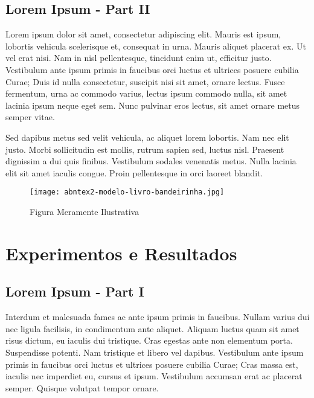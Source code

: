 \documentclass[
	12pt,				%
    oneside,			%
	a4paper,			%
	english,			%
	french,				%
	spanish,			%
	brazil				%
	]{abntex2}
\begin{document}
\section{Lorem Ipsum - Part II}

Lorem ipsum dolor sit amet, consectetur adipiscing elit. Mauris est ipsum, lobortis vehicula scelerisque et, consequat in urna. Mauris aliquet placerat ex. Ut vel erat nisi. Nam in nisl pellentesque, tincidunt enim ut, efficitur justo. Vestibulum ante ipsum primis in faucibus orci luctus et ultrices posuere cubilia Curae; Duis id nulla consectetur, suscipit nisi sit amet, ornare lectus. Fusce fermentum, urna ac commodo varius, lectus ipsum commodo nulla, sit amet lacinia ipsum neque eget sem. Nunc pulvinar eros lectus, sit amet ornare metus semper vitae.

Sed dapibus metus sed velit vehicula, ac aliquet lorem lobortis. Nam nec elit justo. Morbi sollicitudin est mollis, rutrum sapien sed, luctus nisl. Praesent dignissim a dui quis finibus. Vestibulum sodales venenatis metus. Nulla lacinia elit sit amet iaculis congue. Proin pellentesque in orci laoreet blandit.

\begin{figure}[!ht]
  \centering
  \texttt{[image: abntex2-modelo-livro-bandeirinha.jpg]}\\
  \caption{Figura Meramente Ilustrativa}\label{fig1}
\end{figure}

\chapter{Experimentos e Resultados}

\section{Lorem Ipsum - Part I}

Interdum et malesuada fames ac ante ipsum primis in faucibus. Nullam varius dui nec ligula facilisis, in condimentum ante aliquet. Aliquam luctus quam sit amet risus dictum, eu iaculis dui tristique. Cras egestas ante non elementum porta. Suspendisse potenti. Nam tristique et libero vel dapibus. Vestibulum ante ipsum primis in faucibus orci luctus et ultrices posuere cubilia Curae; Cras massa est, iaculis nec imperdiet eu, cursus et ipsum. Vestibulum accumsan erat ac placerat semper. Quisque volutpat tempor ornare.
\end{document}
